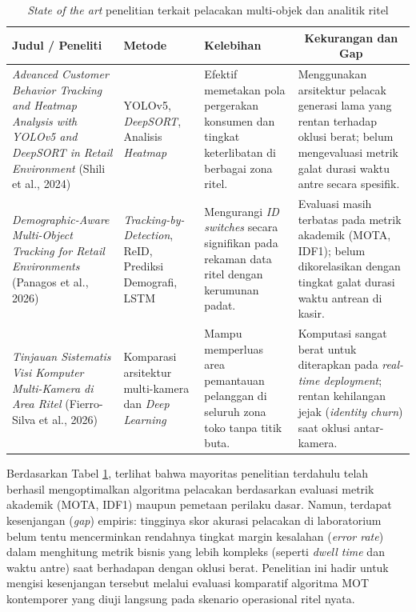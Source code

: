 \begin{table}[htbp]
    \centering
    \caption{\textit{State of the art} penelitian terkait pelacakan multi-objek dan analitik ritel}
    \label{tab:state_of_the_art}
    \renewcommand{\arraystretch}{1.5} 
    \begin{tabular}{|p{3.5cm}|p{3.2cm}|p{3.2cm}|p{3.8cm}|}
        \hline
        \centering\textbf{Judul / Peneliti} & \centering\textbf{Metode} & \centering\textbf{Kelebihan} & \multicolumn{1}{c|}{\textbf{Kekurangan dan Gap}} \\
        \hline
        \textit{Advanced Customer Behavior Tracking and Heatmap Analysis with YOLOv5 and DeepSORT in Retail Environment} (Shili et al., 2024)
        & YOLOv5, \textit{DeepSORT}, Analisis \textit{Heatmap} 
        & Efektif memetakan pola pergerakan konsumen dan tingkat keterlibatan di berbagai zona ritel. 
        & Menggunakan arsitektur pelacak generasi lama yang rentan terhadap oklusi berat; belum mengevaluasi metrik galat durasi waktu antre secara spesifik. \\
        \hline
        \textit{Demographic-Aware Multi-Object Tracking for Retail Environments} (Panagos et al., 2026) 
        & \textit{Tracking-by-Detection}, ReID, Prediksi Demografi, LSTM 
        & Mengurangi \textit{ID switches} secara signifikan pada rekaman data ritel dengan kerumunan padat. 
        & Evaluasi masih terbatas pada metrik akademik (MOTA, IDF1); belum dikorelasikan dengan tingkat galat durasi waktu antrean di kasir. \\
        \hline
        \textit{Tinjauan Sistematis Visi Komputer Multi-Kamera di Area Ritel} (Fierro-Silva et al., 2026) 
        & Komparasi arsitektur multi-kamera dan \textit{Deep Learning} 
        & Mampu memperluas area pemantauan pelanggan di seluruh zona toko tanpa titik buta. 
        & Komputasi sangat berat untuk diterapkan pada \textit{real-time deployment}; rentan kehilangan jejak (\textit{identity churn}) saat oklusi antar-kamera. \\
        \hline
    \end{tabular}
\end{table}

Berdasarkan Tabel \ref{tab:state_of_the_art}, terlihat bahwa mayoritas penelitian terdahulu telah berhasil mengoptimalkan algoritma pelacakan berdasarkan evaluasi metrik akademik (MOTA, IDF1) maupun pemetaan perilaku dasar. Namun, terdapat kesenjangan (\textit{gap}) empiris: tingginya skor akurasi pelacakan di laboratorium belum tentu mencerminkan rendahnya tingkat margin kesalahan (\textit{error rate}) dalam menghitung metrik bisnis yang lebih kompleks (seperti \textit{dwell time} dan waktu antre) saat berhadapan dengan oklusi berat. Penelitian ini hadir untuk mengisi kesenjangan tersebut melalui evaluasi komparatif algoritma MOT kontemporer yang diuji langsung pada skenario operasional ritel nyata.

